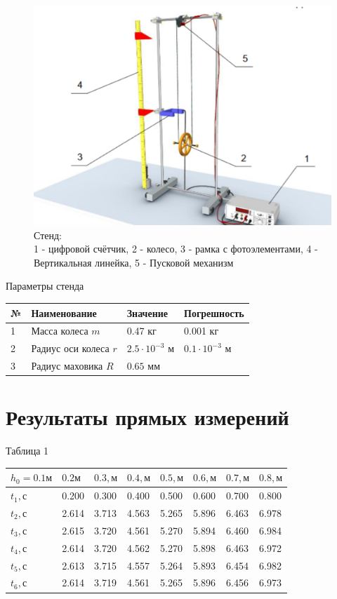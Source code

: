 \documentclass[a4paper]{article}
\begin{document}
\begin{figure}[h!]
   \includegraphics[scale=0.3]{stend.png}
    \caption{Стенд:\\ 1 - цифровой счётчик, 2 - колесо, 3 - рамка с фотоэлементами, 4 - Вертикальная линейка, 5 - Пусковой механизм}
    \label{stend}
\end{figure}

$\textbf{Параметры стенда}$\\
\begin{tabular}{| l | l | l | l | }\hline
№ & Наименование & Значение  & Погрешность\\ \hline
1 & Масса колеса $m$ & 0.47 кг & 0.001 кг \\
2 & Радиус оси колеса $r$ & $2.5 \cdot 10^{-3}$ м & $0.1 \cdot 10^{-3}$ м\\
3 & Радиус маховика $R$ & $0.65$ мм & \\ \hline
\end{tabular}
\newpage
\section{Результаты прямых измерений}
Таблица 1

\begin{tabular}{| l | l | l | l | l | l | l | l |}\hline
$h_0 = 0.1 м$ & $0.2 м$ & $0.3, м$ & $0.4, м$ & $0.5, м$ & $0.6, м$ & $0.7, м$ & $0.8, м$ \\ \hline
$t_1, с$ & 0.200 & 0.300 & 0.400 & 0.500 & 0.600 & 0.700 & 0.800 \\ \hline
$t_2, с$ & 2.614 & 3.713 & 4.563 & 5.265 & 5.896 & 6.463 & 6.978 \\ \hline
$t_3, с$ & 2.615 & 3.720 & 4.561 & 5.270 & 5.894 & 6.460 & 6.984 \\ \hline
$t_4, с$ & 2.614 & 3.720 & 4.562 & 5.270 & 5.898 & 6.463 & 6.972 \\ \hline
$t_5, с$ & 2.613 & 3.715 & 4.557 & 5.264 & 5.893 & 6.454 & 6.982 \\ \hline
$t_6, с$ & 2.614 & 3.719 & 4.561 & 5.265 & 5.896 & 6.456 & 6.973 \\ \hline
\end{tabular}
\medbreak
\end{document}
